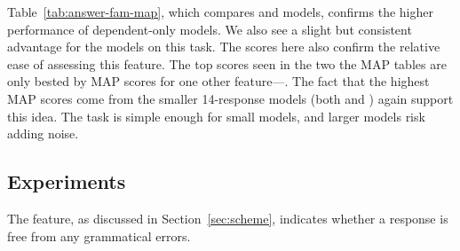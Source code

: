 Table~\ref{tab:answer-fam-map}, which compares  and  models, confirms the higher performance of dependent-only models. We also see a slight but consistent advantage for the  models on this task.
The scores here also confirm the relative ease of assessing this feature. The top scores seen in the two the  MAP tables are only bested by MAP scores for one other feature---. The fact that the highest  MAP scores come from the smaller 14-response models (both  and ) again support this idea. The task is simple enough for small models, and larger models risk adding noise.


\subsection{ Experiments}
\label{sec:map-gramm}

The  feature, as discussed in Section~\ref{sec:scheme}, indicates whether a response is free from any grammatical errors. 


